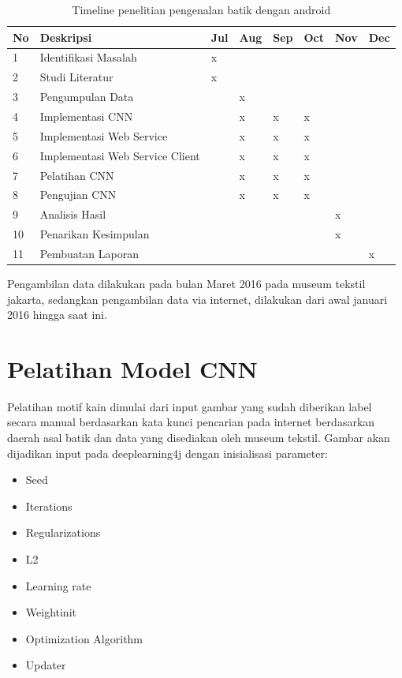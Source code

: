 \begin{table}
	\centering
	\caption{Timeline penelitian pengenalan batik dengan android}
	\label{tab:tab1}
	\begin{tabular}{|l|l|l|l|l|l|l|l|}
		\hline
		No & Deskripsi & Jul & Aug & Sep & Oct & Nov & Dec\\ 
		\hline
		1 & Identifikasi Masalah &x&&&&&\\
		\hline
		2 & Studi Literatur&x&&&&&\\
		\hline
		3 & Pengumpulan Data&&x&&&&\\
		\hline
		4 & Implementasi CNN&&x&x&x&&\\
		\hline
		5 & Implementasi Web Service&&x&x&x&&\\
		\hline
		6 & Implementasi Web Service Client&&x&x&x&&\\
		\hline
		7 & Pelatihan CNN&&x&x&x&&\\
		\hline
		8 & Pengujian CNN&&x&x&x&&\\
		\hline
		9 & Analisis Hasil&&&&&x&\\
		\hline
		10 & Penarikan Kesimpulan&&&&&x&\\
		\hline
		11 & Pembuatan Laporan&&&&&&x\\
		\hline
	\end{tabular}
\end{table}
Pengambilan data dilakukan pada bulan Maret 2016 pada museum tekstil jakarta, sedangkan pengambilan data via internet, dilakukan dari awal januari 2016 hingga saat ini.

\section{Pelatihan Model CNN}
Pelatihan motif kain dimulai dari input gambar yang sudah diberikan label secara manual berdasarkan kata kunci pencarian pada internet berdasarkan daerah asal batik dan data yang disediakan oleh museum tekstil. Gambar akan dijadikan input pada deeplearning4j dengan inisialisasi parameter:
\begin{itemize}
\item Seed
\item Iterations
\item Regularizations
\item L2
\item Learning rate
\item Weightinit
\item Optimization Algorithm
\item Updater
\end{itemize}

